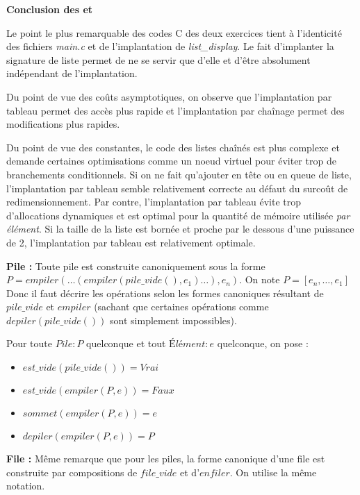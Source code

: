 \documentclass[../main.tex]{subfiles}
\begin{document}
 \textbf{Conclusion des  et }

 Le point le plus remarquable des codes C des deux exercices tient à l'identicité des fichiers \textit{main.c} et de l'implantation de \textit{list\_display}. Le fait d'implanter la signature de liste permet de ne se servir que d'elle et d'être absolument indépendant de l'implantation.

 Du point de vue des coûts asymptotiques, on observe que l'implantation par tableau permet des accès plus rapide et l'implantation par chaînage permet des modifications plus rapides.

 Du point de vue des constantes, le code des listes chaînés est plus complexe et demande certaines optimisations comme un noeud virtuel pour éviter trop de branchements conditionnels. Si on ne fait qu'ajouter en tête ou en queue de liste, l'implantation par tableau semble relativement correcte au défaut du surcoût de redimensionnement. Par contre, l'implantation par tableau évite trop d'allocations dynamiques et est optimal pour la quantité de mémoire utilisée \textit{par élément}. Si la taille de la liste est bornée et proche par le dessous d'une puissance de 2, l'implantation par tableau est relativement optimale.


\textbf{Pile :} Toute pile est construite canoniquement sous la forme $P= empiler(\dots(empiler(pile\_vide(), e_1)\dots), e_n)$. On note $P = [e_n, \dots, e_1]$ Donc il faut décrire les opérations selon les formes canoniques résultant de $pile\_vide$ et $empiler$ (sachant que certaines opérations comme $depiler(pile\_vide())$ sont simplement impossibles).

Pour toute $Pile:P$ quelconque et tout $\textit{Élément}:e$ quelconque, on pose :
\begin{itemize}
	\item $est\_vide(pile\_vide()) = \textit{Vrai}$
	\item $est\_vide(empiler(P, e)) = \textit{Faux}$
	\item $sommet(empiler(P, e)) = e$
	\item $depiler(empiler(P, e)) = P$
\end{itemize}

\textbf{File :} Même remarque que pour les piles, la forme canonique d'une file est construite par compositions de $file\_vide$ et d'$enfiler$. On utilise la même notation.
\end{document}
